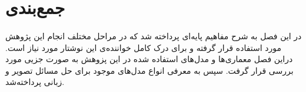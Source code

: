 \section{جمع‌بندی}
\paragraph{}
{
    در این فصل به شرح مفاهیم پایه‌ای پرداخته شد که در مراحل مختلف انجام
    این پژوهش مورد استفاده قرار گرفته و برای درک کامل خواننده‌ی
    این نوشتار مورد نیاز است.
    دراین فصل معماری‌ها و مدل‌های استفاده شده در این پزوهش به صورت جزیی مورد بررسی قرار
    گرفت. سپس به معرفی انواع مدل‌های موجود برای حل مسائل تصویر و زبانی پرداخته‌شد. 
}
